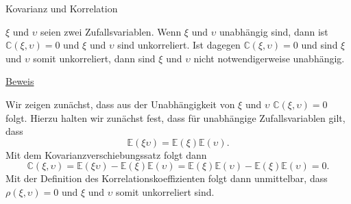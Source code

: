 \documentclass[
  8pt,
  ignorenonframetext,
]{beamer}
\newcommand{\ups}{\upsilon}
\begin{document}
\begin{frame}{Kovarianz und Korrelation}
\protect\hypertarget{kovarianz-und-korrelation-4}{}
\small
\begin{theorem}
\justifying
\normalfont
$\xi$ und $\ups$ seien zwei Zufallsvariablen. Wenn $\xi$ und $\ups$ unabhängig sind, 
dann ist $\mathbb{C}(\xi,\ups) = 0$ und $\xi$ und $\ups$ sind unkorreliert. Ist dagegen
$\mathbb{C}(\xi,\ups) = 0$ und sind $\xi$ und $\ups$ somit unkorreliert, dann sind $\xi$ 
und $\ups$ nicht notwendigerweise unabhängig.
\end{theorem}

\footnotesize

\underline{Beweis} \vspace{1mm}

Wir zeigen zunächst, dass aus der Unabhängigkeit von \(\xi\) und
\(\ups\) \(\mathbb{C}(\xi,\ups) = 0\) folgt. Hierzu halten wir zunächst
fest, dass für unabhängige Zufallsvariablen gilt, dass \begin{equation}
\mathbb{E}(\xi\ups) = \mathbb{E}(\xi)\mathbb{E}(\ups).
\end{equation} Mit dem Kovarianzverschiebungssatz folgt dann
\begin{equation}
\mathbb{C}(\xi,\ups)
= \mathbb{E}(\xi\ups) - \mathbb{E}(\xi)\mathbb{E}(\ups)
= \mathbb{E}(\xi)\mathbb{E}(\ups) - \mathbb{E}(\xi)\mathbb{E}(\ups)
= 0.
\end{equation} Mit der Definition des Korrelationskoeffizienten folgt
dann unmittelbar, dass \(\rho(\xi,\ups) = 0\) und \(\xi\) und \(\ups\)
somit unkorreliert sind.
\end{frame}
\end{document}
